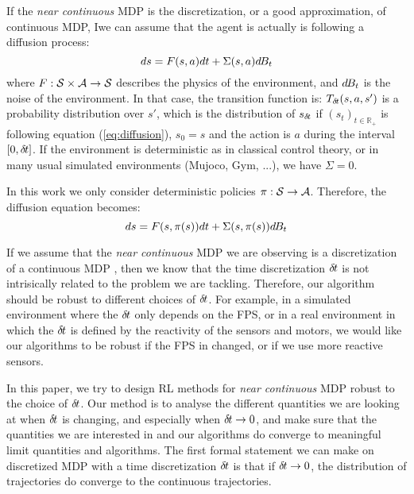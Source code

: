 

If the \emph{near continuous} MDP is the discretization, or a good approximation, of continuous MDP, Iwe can assume that the agent is actually is following a diffusion process:
\begin{equation}
  \label{eq:diffusion}
  ds = F(s, a)dt + \Sigma(s, a)d\hspace{-.1em}B_t
\end{equation}
where $F: {\cal S}\times{\cal A}\rightarrow {\cal S}$ describes the physics of the environment, and $d\hspace{-.1em}B_t$ is the noise of the environment. In that case, the transition function is: $T_{\delta\hspace{-.1em}t}(s, a, s')$ is a probability distribution over $s'$, which is the distribution of $s_{\delta\hspace{-.1em}t}$ if $(s_t)_{t\in\mathbb{R_+}}$ is following equation (\ref{eq:diffusion}), $s_0 = s$ and the action is $a$ during the interval $[0, {\delta\hspace{-.1em}t}]$. If the environment is deterministic as in classical control theory, or in many usual simulated environments (Mujoco, Gym, ...), we have $\Sigma = 0$.

In this work we only consider deterministic policies $\pi: {\cal S} \rightarrow {\cal A}$. Therefore, the diffusion equation becomes:
\begin{equation}
  \label{eq:diffusion-policy}
  ds = F(s, \pi(s))dt + \Sigma(s, \pi(s))d\hspace{-.1em}B_t
\end{equation}

If we assume that the \emph{near continuous} MDP we are observing is a discretization of a continuous MDP , then we know that the time discretization ${\delta\hspace{-.1em}t}$ is not intrisically related to the problem we are tackling. Therefore, our algorithm should be robust to different choices of ${\delta\hspace{-.1em}t}$. For example, in a simulated environment where the ${\delta\hspace{-.1em}t}$ only depends on the FPS, or in a real environment in which the ${\delta\hspace{-.1em}t}$ is defined by the reactivity of the sensors and motors, we would like our algorithms to be robust if the FPS in changed, or if we use more reactive sensors.

In this paper, we try to design RL methods for \emph{near continuous} MDP robust to the choice of ${\delta\hspace{-.1em}t}$. Our method is to analyse the different quantities we are looking at when ${\delta\hspace{-.1em}t}$ is changing, and especially when ${\delta\hspace{-.1em}t} \rightarrow 0$, and make sure that the quantities we are interested in and our algorithms do converge to meaningful limit quantities and algorithms.  The first formal statement we can make on discretized MDP with a time discretization ${\delta\hspace{-.1em}t}$ is that if ${\delta\hspace{-.1em}t} \rightarrow 0$, the distribution of trajectories do converge to the continuous trajectories.


